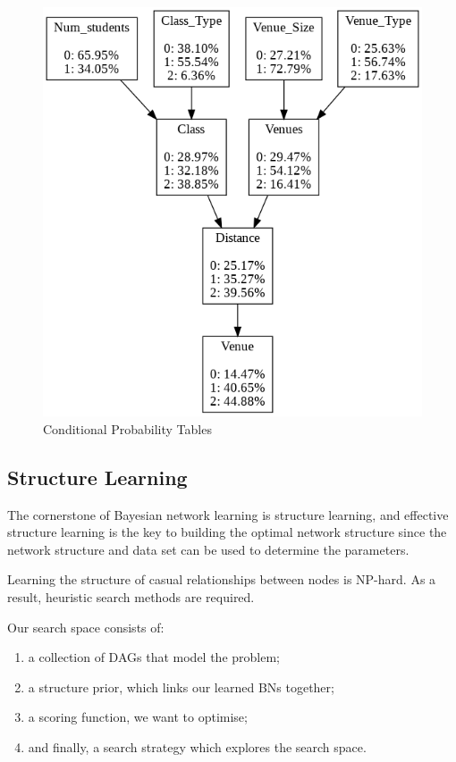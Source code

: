 \documentclass[conference]{IEEEtran}
\begin{document}
\begin{figure}[h]
    \center
  \includegraphics[scale=0.35]{images/download (1).png}
  \caption{Conditional Probability Tables}
  \label{fig:boat2}
\end{figure}

\subsection{Structure Learning}
The cornerstone of Bayesian network learning is structure learning, and effective structure learning is the key to building the optimal network structure since the network structure and data set can be used to determine the parameters.

Learning the structure of casual relationships between nodes is NP-hard. As a result, heuristic search methods are required.

Our search space consists of:
\begin{enumerate}
    \item a collection of DAGs that model the problem;
    \item a structure prior, which links our learned BNs together;
    \item a scoring function, we want to optimise;
    \item and finally, a search strategy which explores the search space.
\end{enumerate}
\end{document}
